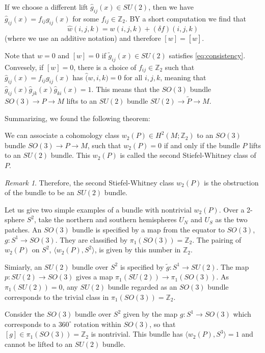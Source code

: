 \documentclass[12pt]{article}
\numberwithin{equation}{section}
\numberwithin{figure}{section}
\theoremstyle{remark}
\newtheorem{remark}[definition]{Remark}
\def\bZ{\mathbb{Z}}
\begin{document}
If we choose a different lift $\hat g_{ij}(x)\in SU(2)$, then we have 
$\hat g_{ij}(x)= f_{ij} g_{ij}(x)$ for some $f_{ij}\in \bZ_2$.
BY a short computation we find that 
\begin{equation}
\hat w(i,j,k) = w(i,j,k) + (\delta f)(i,j,k)
\end{equation} (where we use an additive notation) and therefore $[w]=[\hat w]$.

Note that $w=0$ and $[w]=0$ if $\tilde g_{ij}(x)\in SU(2)$ satisfies \eqref{eq:consistency}.
Convesely, if $[w]=0$, there is a choice of $f_{ij}\in \bZ_2$ such that $\hat g_{ij}(x)= f_{ij} g_{ij}(x)$ has $\hat (w,i,k)=0$ for all $i,j,k$,
meaning that $\hat g_{ij}(x) \hat g_{jk}(x)\hat g_{ki}(x)=1$.
This means that the $SO(3)$ bundle $SO(3)\to P\to M$ lifts to an $SU(2)$ bundle $SU(2)\to \tilde P\to M$.

Summarizing, we found the following theorem:
\begin{theorem}
  We can associate a cohomology class $w_2(P)\in H^2(M;\bZ_2)$ to an $SO(3)$ bundle $SO(3)\to P\to M$,
  such that $w_2(P)=0$ if and only if the bundle $P$ lifts to an $SU(2)$ bundle.
  This $w_2(P)$ is called the second Stiefel-Whitney class of $P$.
\end{theorem}

\begin{remark}
  Therefore, the second Stiefel-Whitney class $w_2(P)$ is the obstruction of the bundle to be an $SU(2)$ bundle.
\end{remark}

Let us give two simple examples of a bundle with nontrivial $w_2(P)$.
Over a 2-sphere $S^2$, take the northern and southern hemispheres $U_N$ and $U_S$ as the two patches.
An $SO(3)$ bundle is specified by a map from the equator to $SO(3)$, $g:S^1\to SO(3)$. 
They are classified by $\pi_1(SO(3))=\bZ_2$.
The pairing of $w_2(P)$ on $S^2$, $\langle w_2(P),S^2\rangle$, is given by this number in $\bZ_2$.

Simiarly, an $SU(2)$ bundle over $S^2$ is specified by $\tilde g: S^1\to SU(2)$.
The map $p:SU(2)\to SO(3)$ gives a map $\pi_1(SU(2))\to \pi_1(SO(3))$.
As $\pi_1(SU(2))=0$,
any $SU(2)$ bundle regarded as an $SO(3)$ bundle 
corresponds to the trivial class in $\pi_1(SO(3))=\bZ_2$.

\begin{example}
Consider the $SO(3)$ bundle over $S^2$ given by 
the map $g: S^1\to SO(3)$ which corresponds to a $360^\circ$ rotation within $SO(3)$, so that $[g]\in \pi_1(SO(3))=\bZ_2$ is nontrivial.
This bundle has $\langle w_2(P),S^3\rangle=1$ and cannot be lifted to an $SU(2)$ bundle.
\end{example}
\end{document}
